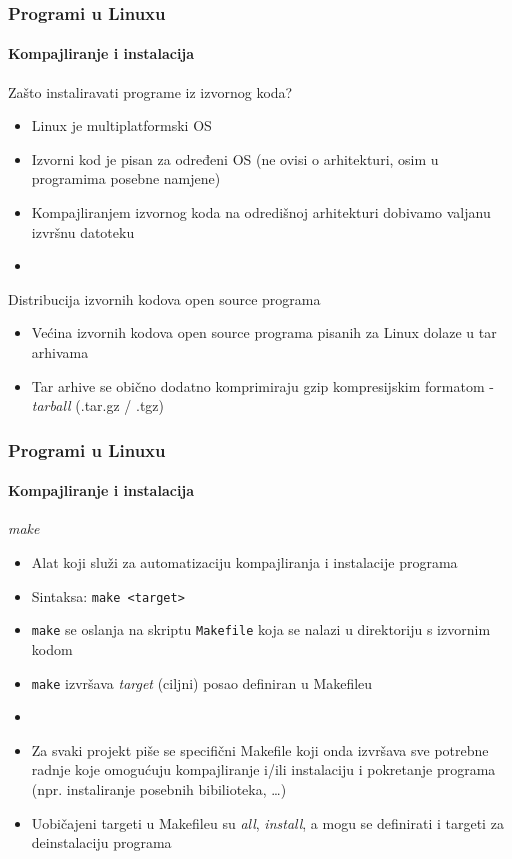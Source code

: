 \documentclass[table,usenames,dvipsnames]{beamer}
\newcommand{\shell}[1]{\texttt{#1}}
\begin{document}
\begin{frame}[t]
	\frametitle{Programi u Linuxu}
	\framesubtitle{Kompajliranje i instalacija}
	Zašto instaliravati programe iz izvornog koda?
	\begin{itemize}
		\item Linux je multiplatformski OS
		\item Izvorni kod je pisan za određeni OS (ne ovisi o arhitekturi, osim u programima posebne namjene)
		\item Kompajliranjem izvornog koda na odredišnoj arhitekturi dobivamo valjanu izvršnu datoteku
		\item[]
	\end{itemize}
	Distribucija izvornih kodova open source programa
	\begin{itemize}
		\item Većina izvornih kodova open source programa pisanih za Linux dolaze u tar arhivama
		\item Tar arhive se obično dodatno komprimiraju gzip kompresijskim formatom - \emph{tarball} (.tar.gz / .tgz)
	\end{itemize}
\end{frame}


\begin{frame}[t]
	\frametitle{Programi u Linuxu}
	\framesubtitle{Kompajliranje i instalacija}
	\emph{make}
	\begin{itemize}
		\item Alat koji služi za automatizaciju kompajliranja i instalacije programa
		\item[] Sintaksa: \shell{make <target>}
		\item \shell{make} se oslanja na skriptu \shell{Makefile} koja se nalazi u direktoriju s izvornim kodom
		\item \shell{make} izvršava \emph{target} (ciljni) posao definiran u Makefileu
		\item[]
		\item Za svaki projekt piše se specifični Makefile koji onda izvršava sve potrebne radnje koje omogućuju kompajliranje i/ili instalaciju i pokretanje programa (npr. instaliranje posebnih bibilioteka, \ldots)
		\item Uobičajeni targeti u Makefileu su \emph{all}, \emph{install}, a mogu se definirati i targeti za deinstalaciju programa
	\end{itemize}
\end{frame}
\end{document}
